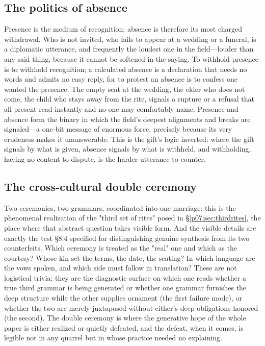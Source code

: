 \documentclass[11pt,a4paper]{article}
\newcommand{\xref}[1]{\textcolor{rose}{\S\ref{#1}}}
\newcommand{\pinkref}[1]{\textcolor{rose}{#1}}
\begin{document}
\subsection{The politics of absence}
Presence is the medium of recognition; absence is therefore its most charged withdrawal. Who is not invited, who fails to appear at a wedding or a funeral, is a diplomatic utterance, and frequently the loudest one in the field---louder than any said thing, because it cannot be softened in the saying. To withhold presence is to withhold recognition; a calculated absence is a declaration that needs no words and admits no easy reply, for to protest an absence is to confess one wanted the presence. The empty seat at the wedding, the elder who does not come, the child who stays away from the rite, signals a rupture or a refusal that all present read instantly and no one may comfortably name. Presence and absence form the binary in which the field's deepest alignments and breaks are signaled---a one-bit message of enormous force, precisely because its very crudeness makes it unanswerable. This is the gift's logic inverted: where the gift signals by what is given, absence signals by what is withheld, and withholding, having no content to dispute, is the harder utterance to counter.

\subsection{The cross-cultural double ceremony}
Two ceremonies, two grammars, coordinated into one marriage: this is the phenomenal realization of the "third set of rites" posed in \xref{p07:sec:thirdrites}, the place where that abstract question takes visible form. And the visible details are exactly the test \pinkref{§8.4} specified for distinguishing genuine synthesis from its two counterfeits. Which ceremony is treated as the "real" one and which as the courtesy? Whose kin set the terms, the date, the seating? In which language are the vows spoken, and which side must follow in translation? These are not logistical trivia; they are the diagnostic surface on which one reads whether a true third grammar is being generated or whether one grammar furnishes the deep structure while the other supplies ornament (the first failure mode), or whether the two are merely juxtaposed without either's deep obligations honored (the second). The double ceremony is where the generative hope of the whole paper is either realized or quietly defeated, and the defeat, when it comes, is legible not in any quarrel but in whose practice needed no explaining.
\end{document}
